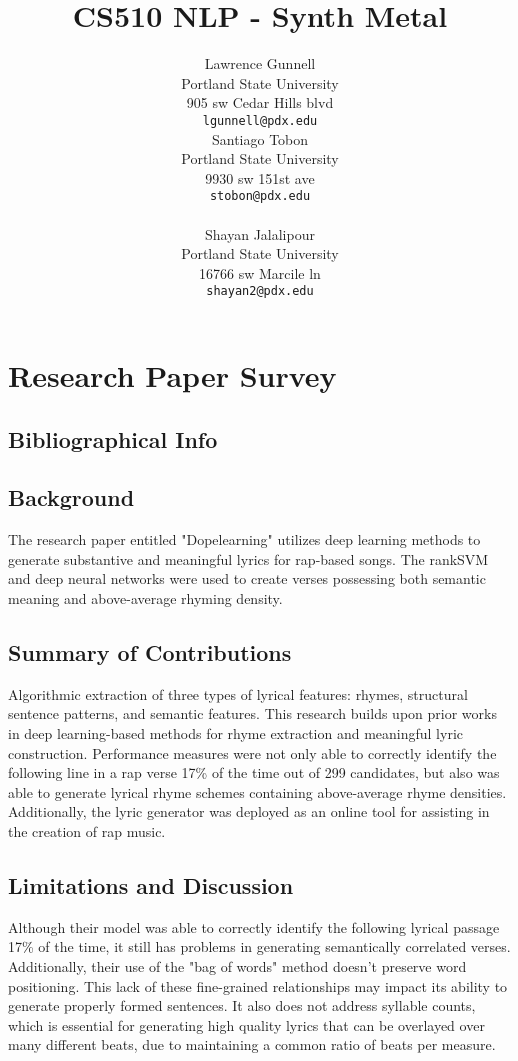 \documentclass[11pt]{article}
\title{CS510 NLP - Synth Metal \emojione{}{\scalerel*{\texttt{[image: 1F918]}}{X}}}
\author{Lawrence Gunnell \\
  Portland State University \\
  905 sw Cedar Hills blvd \\
  {\tt lgunnell@pdx.edu} \\\And
  Santiago Tobon \\
  Portland State University \\
  9930 sw 151st ave \\
  {\tt stobon@pdx.edu} \\ \\\And
  Shayan Jalalipour \\
  Portland State University \\
  16766 sw Marcile ln \\
  {\tt shayan2@pdx.edu} \\}
\date{}
\begin{document}
\maketitle


\section{Research Paper Survey}

\subsection{Bibliographical Info}


\subsection{Background}
The research paper entitled "Dopelearning" utilizes deep learning methods to generate substantive and meaningful lyrics for rap-based songs. The rankSVM and deep neural networks were used to create verses possessing both semantic meaning and above-average rhyming density. 
\subsection{Summary of Contributions}
Algorithmic extraction of three types of lyrical features:
rhymes, structural sentence patterns, and semantic features. This research builds upon prior works in deep learning-based methods for rhyme extraction and meaningful lyric construction. Performance measures were not only able to correctly identify the following line in a rap verse 17\% of the time out of 299 candidates, but also was able to generate lyrical rhyme schemes containing above-average rhyme densities. Additionally, the lyric generator was deployed as an online tool for assisting in the creation of rap music.
\subsection{Limitations and Discussion}
Although their model was able to correctly identify the following lyrical passage 17\% of the time, it still has problems in generating semantically correlated verses. Additionally, their use of the "bag of words" method doesn't preserve word positioning. This lack of these fine-grained relationships may impact its ability to generate properly formed sentences. It also does not address syllable counts, which is essential for generating high quality lyrics that can be overlayed over many different beats, due to maintaining a common ratio of beats per measure.
\end{document}
